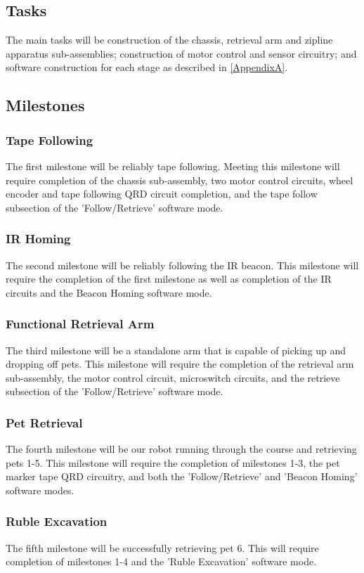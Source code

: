 \documentclass[11pt, oneside]{article} %
\begin{document}
	\subsection{Tasks} 
	The main tasks will be construction of the chassis, retrieval arm and zipline apparatus sub-assemblies; construction of motor control and sensor circuitry; and software construction for each stage as described in \autoref{AppendixA}.

	\subsection{Milestones}
		\subsubsection{Tape Following}
		The first milestone will be reliably tape following. Meeting this milestone will require completion of the chassis sub-assembly, two motor control circuits, wheel encoder and tape following QRD circuit completion, and the tape follow subsection of the 'Follow/Retrieve' software mode.
		\subsubsection{IR Homing}
		The second milestone will be reliably following the IR beacon.  This milestone will require the completion of the first milestone as well as completion of the IR circuits and the Beacon Homing software mode.
		\subsubsection{Functional Retrieval Arm}
		The third milestone will be a standalone arm that is capable of picking up and dropping off pets. This milestone will require the completion of the retrieval arm sub-assembly, the motor control circuit, microswitch circuits, and the retrieve subsection of the 'Follow/Retrieve' software mode.
		\subsubsection{Pet Retrieval}
		The fourth milestone will be our robot running through the course and retrieving pets 1-5. This milestone will require the completion of milestones 1-3, the pet marker tape QRD circuitry, and both the 'Follow/Retrieve' and 'Beacon Homing' software modes.
		\subsubsection{Ruble Excavation}
		The fifth milestone will be successfully retrieving pet 6. This will require completion of milestones 1-4 and the 'Ruble Excavation' software mode.
\end{document}
